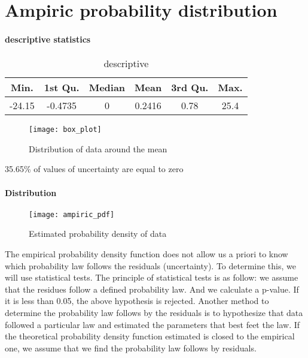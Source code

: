 \section{Ampiric probability distribution}
\paragraph{ descriptive statistics}

\begin{table}[h]
\centering
\caption{descriptive}
\label{my-label}
\begin{tabular}{|c|c|c|c|c|c|}
\hline
\textbf{Min.} & \textbf{1st Qu.} & \textbf{Median} & \textbf{Mean} & \textbf{3rd Qu.} & \textbf{Max.} \\ \hline
-24.15        & -0.4735          & 0               & 0.2416        & 0.78             & 25.4          \\ \hline
\end{tabular}
\end{table}

\begin{figure}[h]
\centering
\texttt{[image: box\_plot]}
\caption{Distribution of data around the mean}
\label{fig:average}
\end{figure}
35.65\% of values of uncertainty are equal  to zero


\paragraph{Distribution}
\begin{figure}[h]
\centering
\texttt{[image: ampiric\_pdf]}
\caption{Estimated probability density of data}
\label{fig:average}
\end{figure}

The empirical probability density function does not allow us a priori to know which probability law follows the residuals (uncertainty). To determine this, we will use statistical tests. The principle of statistical tests is as follow: we assume that the residues follow a defined probability law. And we calculate a p-value. If it is less than 0.05, the above hypothesis is rejected. Another method to determine the probability law follows by the residuals is to hypothesize that data followed a particular law and estimated the parameters that best feet the law. If the theoretical probability density function estimated is closed to the empirical one, we assume that we find the probability law follows by residuals.


